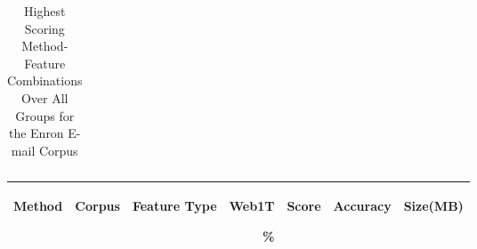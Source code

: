 \begin{table}[htbp!]
\begin{center}
\begin{tabular}{ | r | r | r | r | r | r | r | }
		\end{tabular}
		\caption{Highest Scoring Method-Feature Combinations Over All Groups for the Enron E-mail Corpus}
		\label{tab:top_enron_by_score_all_groups}
	\end{center}
\end{table}

\begin{table}[htbp!]
	\begin{center}
		\begin{tabular}{ | r | r | r | r | r | r | r | }
			\hline
			\begin{sideways}Method\end{sideways} & \begin{sideways}Corpus\end{sideways} & \begin{sideways}Feature Type\end{sideways} & \begin{sideways}Web1T\end{sideways} \% & \begin{sideways}Score\end{sideways} & \begin{sideways}Accuracy\end{sideways} & \begin{sideways}Size(MB)\end{sideways}\\ \hline 
			

\end{tabular}
\end{center}
\end{table}
